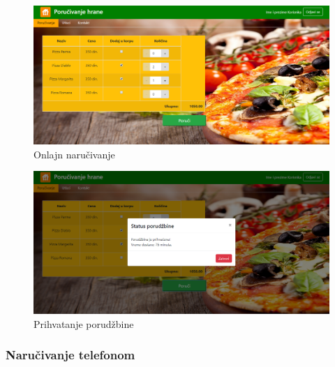  \begin{figure}[ht]
    \leavevmode
    \begin{center}
    \includegraphics[height=0.3\textheight]{slike/narucivanje.png}
    \end{center}
    \caption{Onlajn naručivanje} %
    \label{fig:slika_narucivanje}
\end{figure}

\begin{figure}[ht]
    \leavevmode
    \begin{center}
    \includegraphics[height=0.3\textheight]{slike/narucivanje1.png}
    \end{center}
    \caption{Prihvatanje porudžbine} %
    \label{fig:slika_narucivanje1}
\end{figure}

\subsubsection{Naručivanje telefonom}

